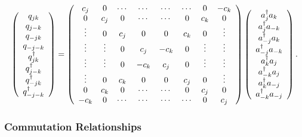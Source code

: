 \documentclass[aps,preprint]{revtex4}%
\begin{document}
\begin{equation}
\left(
\begin{array}
[c]{c}%
q_{jk}\\
q_{j-k}\\
q_{-jk}\\
q_{-j-k}\\
q_{jk}^{\dagger}\\
q_{j-k}^{\dagger}\\
q_{-jk}^{\dagger}\\
q_{-j-k}^{\dagger}%
\end{array}
\right)  =\left(
\begin{array}
[c]{cccccccc}%
c_{j} & 0 & \cdots & \cdots & \cdots & \cdots & 0 & -c_{k}\\
0 & c_{j} & 0 & \cdots & \cdots & 0 & c_{k} & 0\\
\vdots & 0 & c_{j} & 0 & 0 & c_{k} & 0 & \vdots\\
\vdots & \vdots & 0 & c_{j} & -c_{k} & 0 & \vdots & \vdots\\
\vdots & \vdots & 0 & -c_{k} & c_{j} & 0 & \vdots & \vdots\\
\vdots & 0 & c_{k} & 0 & 0 & c_{j} & 0 & \vdots\\
0 & c_{k} & 0 & \cdots & \cdots & 0 & c_{j} & 0\\
-c_{k} & 0 & \cdots & \cdots & \cdots & \cdots & 0 & c_{j}%
\end{array}
\right)  \left(
\begin{array}
[c]{c}%
a_{j}^{\dagger}a_{k}\\
a_{j}^{\dagger}a_{-k}\\
a_{-j}^{\dagger}a_{k}\\
a_{-j}^{\dagger}a_{-k}\\
a_{k}^{\dagger}a_{j}\\
a_{-k}^{\dagger}a_{j}\\
a_{k}^{\dagger}a_{-j}\\
a_{-k}^{\dagger}a_{-j}%
\end{array}
\right)  .
\end{equation}


\subsubsection{Commutation Relationships}
\end{document}
